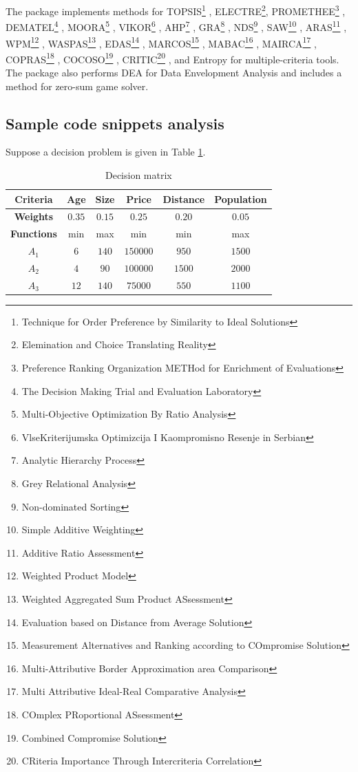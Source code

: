 \documentclass[preprint,review, 12pt, a4paper]{elsarticle}
\begin{document}
The package implements methods for 
TOPSIS\footnote{Technique for Order Preference by Similarity to Ideal Solutions} \cite{topsis}, 
ELECTRE\footnote{Elemination and Choice Translating Reality}\cite{electre}, 
PROMETHEE\footnote{Preference Ranking Organization METHod for Enrichment of Evaluations} \cite{promethee}, 
DEMATEL\footnote{The Decision Making Trial and Evaluation Laboratory} \cite{dematel}, 
MOORA\footnote{Multi-Objective Optimization By Ratio Analysis} \cite{moora}, 
VIKOR\footnote{VlseKriterijumska Optimizcija I Kaompromisno Resenje in Serbian} \cite{vikor_1, vikor_2}, 
AHP\footnote{Analytic Hierarchy Process} \cite{ahp}, 
GRA\footnote{Grey Relational Analysis} \cite{gra}, 
NDS\footnote{Non-dominated Sorting} \cite{Deb_2002}, 
SAW\footnote{Simple Additive Weighting} \cite{saw, wsm_wpm}, 
ARAS\footnote{Additive Ratio Assessment} \cite{aras}, 
WPM\footnote{Weighted Product Model} \cite{wsm_wpm}, 
WASPAS\footnote{Weighted Aggregated Sum Product ASsessment} \cite{waspas}, 
EDAS\footnote{Evaluation based on Distance from Average Solution} \cite{edas}, 
MARCOS\footnote{Measurement Alternatives and Ranking according to COmpromise Solution} \cite{marcos}, 
MABAC\footnote{Multi-Attributive Border Approximation area Comparison} \cite{mabac}, 
MAIRCA\footnote{Multi Attributive Ideal-Real Comparative Analysis} \cite{mairca}, 
COPRAS\footnote{COmplex PRoportional ASsessment} \cite{copras}, 
COCOSO\footnote{Combined Compromise Solution} \cite{cocoso}, 
CRITIC\footnote{CRiteria Importance Through Intercriteria Correlation} \cite{critic},
and Entropy\cite{entropy} for multiple-criteria tools. 
The package also performs DEA for Data Envelopment Analysis \cite{dea} and includes a method for zero-sum game solver.  



\subsection{Sample code snippets analysis}
\label{section:sample_code}

Suppose a decision problem is given in Table \ref{table:example_problem}.

\begin{table}[H]
	\centering
	\begin{tabular}{|c|c|c|c|c|c|}
		\hline
		\textbf{Criteria} & {Age} & {Size} &  {Price} & {Distance} & {Population}\\
		\hline
		\textbf{Weights} & {$0.35$} & {$0.15$} & {$0.25$}& {$0.20$} & {$0.05$} \\
		\hline
		\textbf{Functions} & min  & max & min & min & max\\
		\hline
		\hline
		{$A_1$} & {$6$} & {$140$} & $150000$ & {$950$} & $1500$\\
		\hline
		{$A_2$} & {$4$} & {$90$} & $100000$ & {$1500$} & $2000$\\
		\hline
		{$A_3$} & {$12$} & {$140$} & $75000$ & {$550$} & $1100$\\
		\hline
	\end{tabular}
	\caption{Decision matrix}
	\label{table:example_problem} 
\end{table}
\end{document}
